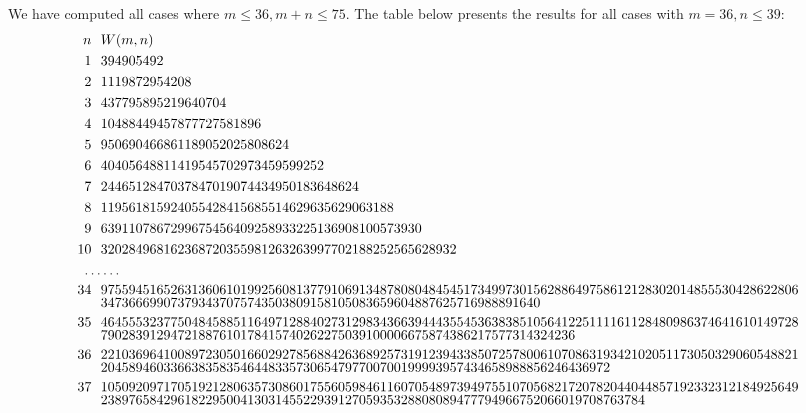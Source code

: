 \documentclass[11pt]{article}
\begin{document}
    We have computed all cases where $m\leq 36,m + n \leq 75$.
    The table below presents the results for all cases with $m = 36, n\leq 39$:
    \tiny
    \begin{align*}
        n~~ & W(m,n)\\
        1~~ & 394905492\\
        2~~ & 1119872954208\\
        3~~ & 437795895219640704\\
        4~~ & 10488449457877727581896\\
        5~~ & 950690466861189052025808624\\
        6~~ & 40405648811419545702973459599252\\
        7~~ & 2446512847037847019074434950183648624\\
        8~~ & 119561815924055428415685514629635629063188\\
        9~~ & 6391107867299675456409258933225136908100573930\\
        10~~ & 320284968162368720355981263263997702188252565628932\\
        \ldots & \ldots\\
        \shortstack[l]{34\\\phantom{0}}~~ &
        \shortstack[l]{9755945165263136061019925608137791069134878080484545173499730156288649758612128302014855530428622806\\347366699073793437075743503809158105083659604887625716988891640}\\
        \shortstack[l]{35\\\phantom{0}}~~ &
        \shortstack[l]{4645553237750484588511649712884027312983436639444355453638385105641225111161128480986374641610149728\\79028391294721887610178415740262275039100006675874386217577314324236}\\
        \shortstack[l]{36\\\phantom{0}}~~ &
        \shortstack[l]{2210369641008972305016602927856884263689257319123943385072578006107086319342102051173050329060548821\\2045894603366383583546448335730654797700700199993957434658988856246436972}\\
        \shortstack[l]{37\\\phantom{0}}~~ &
        \shortstack[l]{1050920971705192128063573086017556059846116070548973949755107056821720782044044857192332312184925649\\238976584296182295004130314552293912705935328808089477794966752066019708763784}\\

\end{align*}
\end{document}
